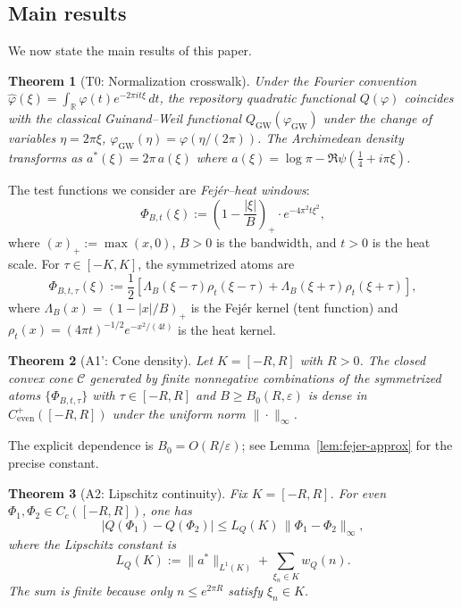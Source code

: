 \documentclass[11pt,a4paper]{article}
\newtheorem{theorem}{Theorem}[section]
\theoremstyle{definition}
\theoremstyle{remark}
\newcommand{\R}{\mathbb{R}}
\begin{document}
\subsection{Main results}

We now state the main results of this paper.

\begin{theorem}[T0: Normalization crosswalk]\label{thm:T0}
Under the Fourier convention $\widehat{\varphi}(\xi) = \int_\R \varphi(t) e^{-2\pi i t \xi}\, dt$, the repository quadratic functional $Q(\varphi)$ coincides with the classical Guinand--Weil functional $Q_{\mathrm{GW}}(\varphi_{\mathrm{GW}})$ under the change of variables $\eta = 2\pi\xi$, $\varphi_{\mathrm{GW}}(\eta) = \varphi(\eta/(2\pi))$. The Archimedean density transforms as $a^*(\xi) = 2\pi\, a(\xi)$ where $a(\xi) = \log\pi - \Re\psi(\tfrac{1}{4} + i\pi\xi)$.
\end{theorem}

The test functions we consider are \emph{Fej\'er--heat windows}:
\begin{equation}\label{eq:Phi-def}
  \Phi_{B,t}(\xi) := \left(1 - \frac{|\xi|}{B}\right)_+ \cdot e^{-4\pi^2 t \xi^2},
\end{equation}
where $(x)_+ := \max(x, 0)$, $B > 0$ is the bandwidth, and $t > 0$ is the heat scale. For $\tau \in [-K, K]$, the symmetrized atoms are
\begin{equation}\label{eq:atom}
  \Phi_{B,t,\tau}(\xi) := \frac{1}{2}\left[ \Lambda_B(\xi - \tau) \rho_t(\xi - \tau) + \Lambda_B(\xi + \tau) \rho_t(\xi + \tau) \right],
\end{equation}
where $\Lambda_B(x) = (1 - |x|/B)_+$ is the Fej\'er kernel (tent function) and $\rho_t(x) = (4\pi t)^{-1/2} e^{-x^2/(4t)}$ is the heat kernel.

\begin{theorem}[A1': Cone density]\label{thm:A1-density}
Let $K = [-R, R]$ with $R > 0$. The closed convex cone $\mathcal{C}$ generated by finite nonnegative combinations of the symmetrized atoms $\{\Phi_{B,t,\tau}\}$ with $\tau \in [-R, R]$ and $B \geq B_0(R, \varepsilon)$ is dense in $C^+_{\mathrm{even}}([-R, R])$ under the uniform norm $\|\cdot\|_\infty$.
\end{theorem}

\noindent The explicit dependence is $B_0 = O(R/\varepsilon)$; see Lemma~\ref{lem:fejer-approx} for the precise constant.

\begin{theorem}[A2: Lipschitz continuity]\label{thm:A2-Lip}
Fix $K = [-R, R]$. For even $\Phi_1, \Phi_2 \in C_c([-R, R])$, one has
\begin{equation}\label{eq:Lip-bound}
  |Q(\Phi_1) - Q(\Phi_2)| \leq L_Q(K)\, \|\Phi_1 - \Phi_2\|_\infty,
\end{equation}
where the Lipschitz constant is
\begin{equation}\label{eq:LQ}
  L_Q(K) := \|a^*\|_{L^1(K)} + \sum_{\xi_n \in K} w_Q(n).
\end{equation}
The sum is finite because only $n \leq e^{2\pi R}$ satisfy $\xi_n \in K$.
\end{theorem}
\end{document}
